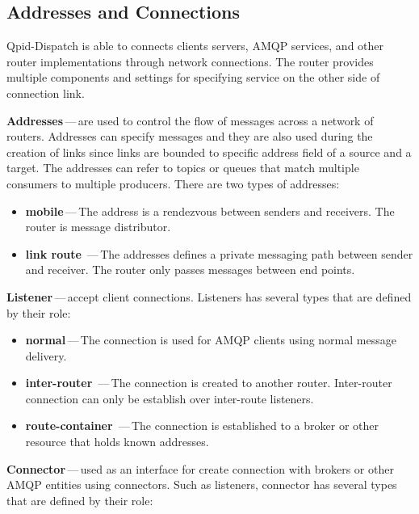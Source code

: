 
\subsection{Addresses and Connections}
\label{Addresses and Connections}
Qpid-Dispatch is able to connects clients servers, AMQP services, and other router implementations through network connections. The router provides multiple components and settings for specifying service on the other side of connection link.

\begin{description}
	\setlength\itemsep{0em}
	\item \textbf{Addresses\footnotemark{}}\,---\,are used to control the flow of messages across a network of routers. Addresses can specify messages and they are also used during the creation of links since links are bounded to specific address field of a source and a target. The addresses can refer to topics or queues that match multiple consumers to multiple producers. There are two types of addresses:
	\begin{itemize}
		\setlength\itemsep{0em}
		\item \textbf{mobile}\,---\,The address is a rendezvous between senders and receivers. The router is message distributor.
		\item \textbf{link route}	\,---\,The addresses defines a private messaging path between sender and receiver. The router only passes messages between end points.
	\end{itemize}
	\item \textbf{Listener}\,---\,accept client connections. Listeners has several types that are defined by their role:
	\begin{itemize}
		\setlength\itemsep{0em}
		\item \textbf{normal}\,---\,The connection is used for AMQP clients using normal message delivery.
		\item \textbf{inter-router}	\,---\,The connection is created to another router. Inter-router connection can only be establish over inter-route listeners.
		\item \textbf{route-container}	\,---\,The connection is established to a broker or other resource that holds known addresses.
	\end{itemize}
	\item \textbf{Connector}\,---\,used as an interface for create connection with brokers or other AMQP entities using connectors. Such as listeners, connector has several types that are defined by their role:

\end{description}
